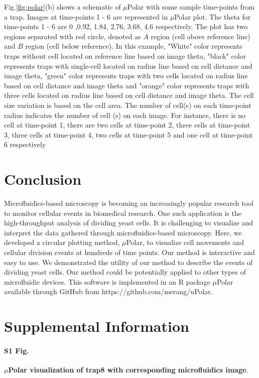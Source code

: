 \documentclass[conference]{IEEEtran}
\begin{document}
Fig.\ref{fig:polar}(b) shows a schematic of $\mu$Polar with some sample time-points from a trap. Images at time-points 1 - 6 are represented in $\mu$Polar plot. The theta for time-points 1 - 6 are 0 ,0.92, 1.84, 2.76, 3.68, 4.6 respectively. The plot has two regions separated with red circle, denoted as $ A $ region (cell above reference line) and $ B $ region (cell below reference). In this example, "White" color represents traps without cell located on reference line based on image theta, "black" color represents traps with single-cell located on radius line based on cell distance and image theta, "green" color represents traps with two cells located on radius line based on cell distance and image theta and "orange" color represents traps with three cells located on radius line based on cell distance and image theta. The cell size variation is based on the cell area. The number of cell(s) on each time-point radius indicates the number of cell (s) on each image. For instance, there is no cell at time-point 1, there are two cells at time-point 2, three cells at time-point 3, three cells at time-point 4, two cells at time-point 5 and one cell at time-point 6 respectively


\section{Conclusion}
Microfluidics-based microscopy is becoming an increasingly popular research tool to monitor cellular events in biomedical research. One such application is the high-throughput analysis of dividing yeast cells. It is challenging to visualize and interpret the data gathered through microfluidics-based microscopy. Here, we developed a circular plotting method, $\mu$Polar, to visualize cell movements and cellular division events at hundreds of time points. Our method is interactive and easy to use. We demonstrated the utility of our method to describe the events of dividing yeast cells. Our method could be potentially applied to other types of microfluidic devices. This software is implemented in an R package $\mu$Polar available through GitHub from https://github.com/merang/uPolar.



\section{Supplemental Information}

\paragraph*{S1 Fig.}
\label{S1_Fig}
{\bf  $\mu$Polar visualization of trap8 with corresponding microfluidics image}. 
\end{document}
